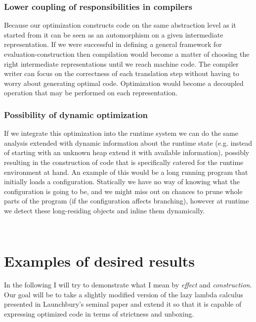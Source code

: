 \documentclass[a4paper]{article}
\begin{document}
\subsubsection*{Lower coupling of responsibilities in compilers}

Because our optimization constructs code on the same abstraction level as it started from it can be seen as an automorphism on a given intermediate representation. If we were successful in defining a general framework for evaluation-construction then compilation would become a matter of choosing the right intermediate representations until we reach machine code. The compiler writer can focus on the correctness of each translation step without having to worry about generating optimal code. Optimization would become a decoupled operation that may be performed on each representation.

\subsubsection*{Possibility of dynamic optimization}

If we integrate this optimization into the runtime system we can do the same analysis extended with dynamic information about the runtime state (e.g. instead of starting with an unknown heap extend it with available information), possibly resulting in the construction of code that is specifically catered for the runtime environment at hand. An example of this would be a long running program that initially loads a configuration. Statically we have no way of knowing what the configuration is going to be, and we might miss out on chances to prune whole parts of the program (if the configuration affects branching), however at runtime we detect these long-residing objects and inline them dynamically.

\mbox{}\\


\section{Examples of desired results}

In the following I will try to demonstrate what I mean by \emph{effect} and \emph{construction}. Our goal will be to take a slightly modified version of the lazy lambda calculus presented in Launchbury's seminal paper\cite{Launchbury:1993:NSL:158511.158618} and extend it so that it is capable of expressing optimized code in terms of strictness and unboxing.
\end{document}
